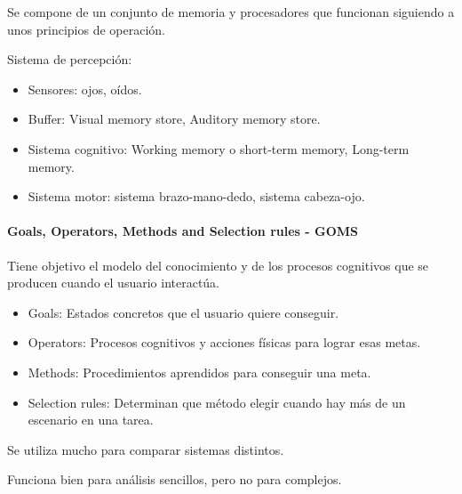 \documentclass[12pt, twoside, openright]{report} %
\begin{document}
        
          Se compone de un conjunto de memoria y procesadores que
          funcionan siguiendo a unos principios de operación.

          Sistema de percepción:

          \begin{itemize}
          
          \item
            Sensores: ojos, oídos.
          \item
            Buffer: Visual memory store, Auditory memory store.
          \item
            Sistema cognitivo: Working memory o short-term memory,
            Long-term memory.
          \item
            Sistema motor: sistema brazo-mano-dedo, sistema cabeza-ojo.
          \end{itemize}

          
\paragraph{Goals, Operators, Methods and Selection rules - GOMS} 
Tiene objetivo el modelo del conocimiento y de los procesos cognitivos
        que se producen cuando el usuario interactúa.

        \begin{itemize}
        \item
          Goals: Estados concretos que el usuario quiere conseguir.
        \item
          Operators: Procesos cognitivos y acciones físicas para lograr
          esas metas.
        \item
          Methods: Procedimientos aprendidos para conseguir una meta.
        \item
          Selection rules: Determinan que método elegir cuando hay más
          de un escenario en una tarea.
        \end{itemize}

          Se utiliza mucho para comparar sistemas distintos.

          Funciona bien para análisis sencillos, pero no para complejos.
\end{document}
